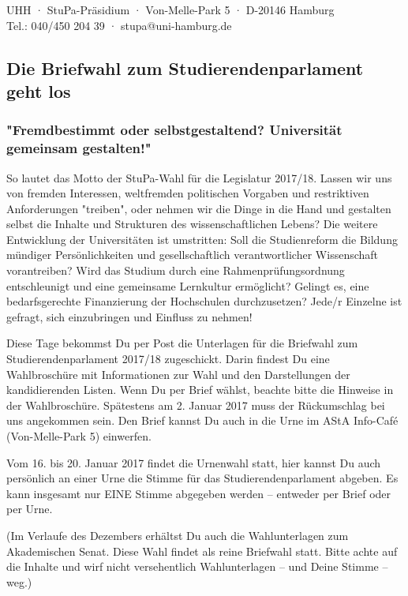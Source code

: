 \documentclass[a4paper,ngerman,headheight=80pt,12pt,DIV=calc]{scrartcl}
\begin{document}
    UHH · StuPa-Präsidium · Von-Melle-Park 5 · D-20146 Hamburg\\
    Tel.: 040/450 204 39 · stupa@uni-hamburg.de

    \subsection*{Die Briefwahl zum Studierendenparlament geht los}
    \subsubsection*{"Fremdbestimmt oder selbstgestaltend? Universität gemeinsam gestalten!"}

    So lautet das Motto der StuPa-Wahl für die Legislatur 2017/18. Lassen wir
    uns von fremden Interessen, weltfremden politischen Vorgaben und restriktiven
    Anforderungen "treiben", oder nehmen wir die Dinge in die Hand und gestalten
    selbst die Inhalte und Strukturen des wissenschaftlichen Lebens?
    Die weitere Entwicklung der Universitäten ist umstritten: Soll die Studienreform
    die Bildung mündiger Persönlichkeiten und gesellschaftlich verantwortlicher
    Wissenschaft vorantreiben? Wird das Studium durch eine Rahmenprüfungsordnung
    entschleunigt und eine gemeinsame Lernkultur ermöglicht? Gelingt es, eine
    bedarfsgerechte Finanzierung der Hochschulen durchzusetzen?
    Jede/r Einzelne ist gefragt, sich einzubringen und Einfluss zu nehmen!

    Diese Tage bekommst Du per Post die Unterlagen für die Briefwahl zum
    Studierendenparlament 2017/18 zugeschickt. Darin findest Du eine Wahlbroschüre
    mit Informationen zur Wahl und den Darstellungen der kandidierenden Listen.
    Wenn Du per Brief wählst, beachte bitte die Hinweise in der Wahlbroschüre.
    Spätestens am 2. Januar 2017 muss der Rückumschlag bei uns angekommen sein.
    Den Brief kannst Du auch in die Urne im AStA Info-Café (Von-Melle-Park 5)
    einwerfen.

    Vom 16. bis 20. Januar 2017 findet die Urnenwahl statt, hier kannst Du auch
    persönlich an einer Urne die Stimme für das Studierendenparlament abgeben.
    Es kann insgesamt nur EINE Stimme abgegeben werden – entweder per Brief oder
    per Urne.

    (Im Verlaufe des Dezembers erhältst Du auch die Wahlunterlagen zum
    Akademischen Senat. Diese Wahl findet als reine Briefwahl statt. Bitte achte
    auf die Inhalte und wirf nicht versehentlich Wahlunterlagen – und Deine
    Stimme – weg.)
\end{document}
